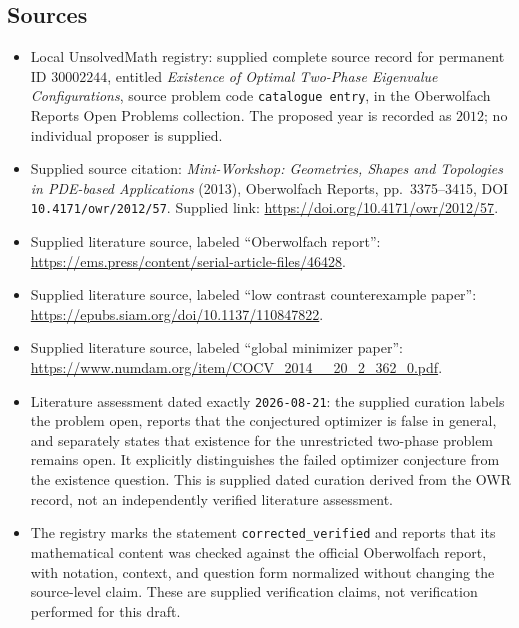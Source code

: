 \documentclass[11pt]{article}
\begin{document}
\subsection{Sources}
\begin{itemize}
\item Local UnsolvedMath registry: supplied complete source record for permanent ID $30002244$, entitled \emph{Existence of Optimal Two-Phase Eigenvalue Configurations}, source problem code \texttt{catalogue entry}, in the Oberwolfach Reports Open Problems collection. The proposed year is recorded as $2012$; no individual proposer is supplied.
\item Supplied source citation: \emph{Mini-Workshop: Geometries, Shapes and Topologies in PDE-based Applications} (2013), Oberwolfach Reports, pp.~3375--3415, DOI \texttt{10.4171/owr/2012/57}. Supplied link: \url{https://doi.org/10.4171/owr/2012/57}.
\item Supplied literature source, labeled ``Oberwolfach report'': \url{https://ems.press/content/serial-article-files/46428}.
\item Supplied literature source, labeled ``low contrast counterexample paper'': \url{https://epubs.siam.org/doi/10.1137/110847822}.
\item Supplied literature source, labeled ``global minimizer paper'': \url{https://www.numdam.org/item/COCV_2014__20_2_362_0.pdf}.
\item Literature assessment dated exactly \texttt{2026-08-21}: the supplied curation labels the problem open, reports that the conjectured optimizer is false in general, and separately states that existence for the unrestricted two-phase problem remains open. It explicitly distinguishes the failed optimizer conjecture from the existence question. This is supplied dated curation derived from the OWR record, not an independently verified literature assessment.
\item The registry marks the statement \texttt{corrected\_verified} and reports that its mathematical content was checked against the official Oberwolfach report, with notation, context, and question form normalized without changing the source-level claim. These are supplied verification claims, not verification performed for this draft.
\end{itemize}
\end{document}

